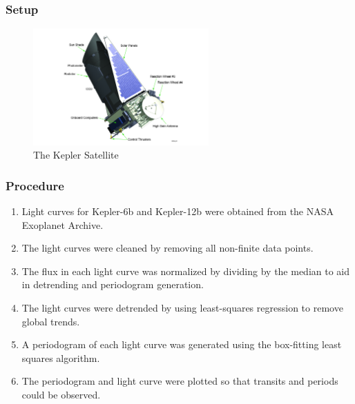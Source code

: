 \begin{frame}
    \frametitle{Setup}
    \begin{figure}[H]
        \centering
        \includegraphics[width=0.6\textwidth]{images/750603main_Ball_Kepler_A8468_275_lg}
        \caption{The Kepler Satellite \autocite{keplerReactionWheelUpdate}}
    \end{figure}
\end{frame}

\begin{frame}
    \frametitle{Procedure}
    \begin{enumerate}
        \item<1-> Light curves for Kepler-6b and Kepler-12b were obtained from the NASA Exoplanet Archive.
        \item<2-> The light curves were cleaned by removing all non-finite data points.
        \item<3-> The flux in each light curve was normalized by dividing by the median to aid in detrending and periodogram generation.
        \item<4-> The light curves were detrended by using least-squares regression to remove global trends.
        \item<5-> A periodogram of each light curve was generated using the box-fitting least squares algorithm.
        \item<6-> The periodogram and light curve were plotted so that transits and periods could be observed.
    \end{enumerate}
\end{frame}

